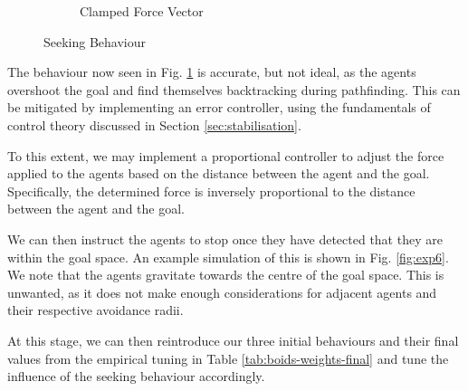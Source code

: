 \documentclass[12pt]{article}
\begin{document}
\begin{figure}[ht]
\begin{subfigure}{.45\textwidth}
\caption{Clamped Force Vector}
\label{fig:exp5}
\end{subfigure}
\caption{Seeking Behaviour}
\label{fig:exp45}
\end{figure}

The behaviour now seen in Fig. \ref{fig:exp5} is accurate, but not ideal, as the agents overshoot the goal and find themselves backtracking during pathfinding. This can be mitigated by implementing an error controller, using the fundamentals of control theory discussed in Section \ref{sec:stabilisation}.

To this extent, we may implement a proportional controller to adjust the force applied to the agents based on the distance between the agent and the goal. Specifically, the determined force is inversely proportional to the distance between the agent and the goal.

We can then instruct the agents to stop once they have detected that they are within the goal space. An example simulation of this is shown in Fig. \ref{fig:exp6}. We note that the agents gravitate towards the centre of the goal space. This is unwanted, as it does not make enough considerations for adjacent agents and their respective avoidance radii. 

At this stage, we can then reintroduce our three initial behaviours and their final values from the empirical tuning in Table \ref{tab:boids-weights-final} and tune the influence of the seeking behaviour accordingly.
\end{document}
